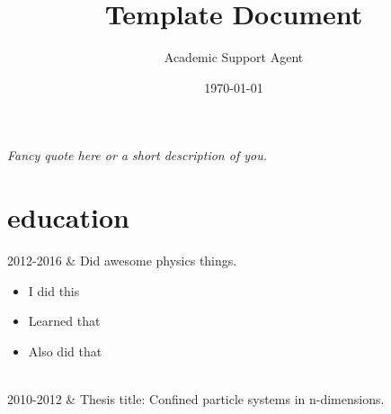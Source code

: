 \documentclass{article}
\title{Template Document}
\author{Academic Support Agent}
\date{\today}
\begin{document}
\maketitle

\pagestyle{empty} %



\textit{Fancy quote here or a short description of you.}

\section*{education}
\begin{tabularcv}
2012-2016   &   
                \newline Did awesome physics things.
                \begin{itemize}
                  \item I did this 
                  \item Learned that
                  \item Also did that
                \end{itemize} 
                \\
                
2010-2012   &   
                \newline Thesis title: Confined particle systems in
                n-dimensions.
\end{tabularcv}
\end{document}
